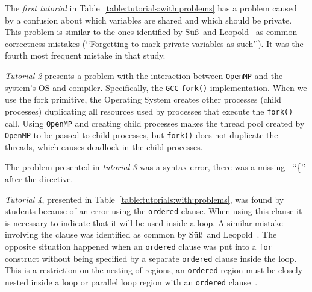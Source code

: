 
The \emph{first tutorial} in Table~\ref{table:tutorials:with:problems} has a problem caused by a confusion about which variables are shared and which should be private. This problem is similar to the ones identified by S\"{u}\ss~and Leopold~\cite{SuB:2005:CMO:1892830.1892863} as common correctness mistakes (\lq\lq{}Forgetting to mark private variables as such\rq\rq{}). It was the fourth most frequent mistake in that study.

\emph{Tutorial 2} presents a problem with the interaction between \texttt{OpenMP} and the system's OS and compiler. Specifically, the \texttt{GCC} \texttt{fork()} implementation. When we use the fork primitive, the Operating System creates other processes (child processes) duplicating all resources used by processes that execute the \texttt{fork()} call. Using \texttt{OpenMP} and creating child processes makes the thread pool created by \texttt{OpenMP} to be passed to child processes, but \texttt{fork()} does not duplicate the threads, which causes deadlock in the child processes.

The problem presented in \emph{tutorial 3} was a syntax error, there was a missing ~\lq\lq\{\rq\rq{} after the directive.

\emph{Tutorial 4}, presented in Table~\ref{table:tutorials:with:problems}, was found by students because of an error using the \texttt{ordered} clause. When using this clause it is necessary to indicate that it will be used inside a loop. A similar mistake involving the clause was identified as common by S\"{u}\ss~and Leopold~\cite{SuB:2005:CMO:1892830.1892863}. The opposite situation happened when an \texttt{ordered} clause was put into a \texttt{for} construct without being specified by a separate \texttt{ordered} clause inside the loop. This is a restriction on the nesting of regions, an \texttt{ordered} region must be closely nested inside a loop or parallel loop region with an \texttt{ordered} clause~\cite{openmp:api:2011}.

